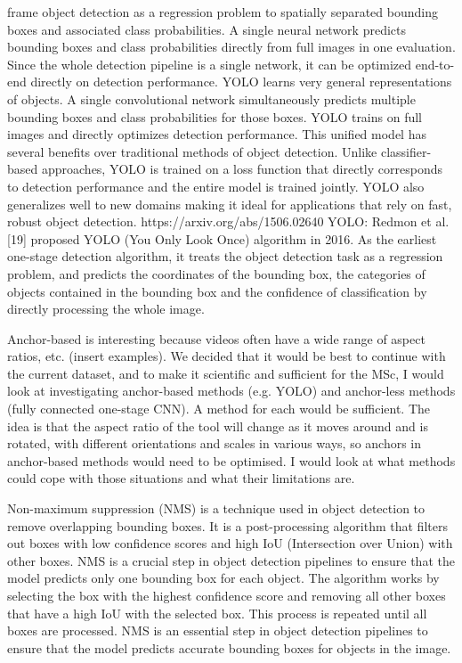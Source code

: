 frame object detection as a regression problem to spatially separated bounding boxes and associated class probabilities. A single neural network predicts bounding boxes and class probabilities directly from full images in one evaluation. Since the whole detection pipeline is a single network, it can be optimized end-to-end directly on detection performance. YOLO learns very general representations of objects. A single convolutional network simultaneously predicts multiple bounding boxes and class probabilities for those boxes. YOLO trains on full images and directly optimizes detection performance. This unified model has several benefits over traditional methods of object detection. Unlike classifier-based approaches, YOLO is trained on a loss function that directly corresponds to detection performance and the entire model is trained jointly. YOLO also generalizes well to new domains making it ideal for applications that rely on fast, robust object detection. https://arxiv.org/abs/1506.02640
YOLO: Redmon et al.[19] proposed YOLO (You Only Look Once) algorithm in 2016. As the earliest one-stage detection algorithm, it treats the object detection task as a regression problem, and predicts the coordinates of the bounding box, the categories of objects contained in the bounding box and the confidence of classification by directly processing the whole image. 

Anchor-based is interesting because videos often have a wide range of aspect ratios, etc. (insert examples). We decided that it would be best to continue with the current dataset, and to make it scientific and sufficient for the MSc, I would look at investigating anchor-based methods (e.g. YOLO) and anchor-less methods (fully connected one-stage CNN). A method for each would be sufficient. The idea is that the aspect ratio of the tool will change as it moves around and is rotated, with different orientations and scales in various ways, so anchors in anchor-based methods would need to be optimised. I would look at what methods could cope with those situations and what their limitations are.

Non-maximum suppression (NMS) is a technique used in object detection to remove overlapping bounding boxes. It is a post-processing algorithm that filters out boxes with low confidence scores and high IoU (Intersection over Union) with other boxes. NMS is a crucial step in object detection pipelines to ensure that the model predicts only one bounding box for each object. The algorithm works by selecting the box with the highest confidence score and removing all other boxes that have a high IoU with the selected box. This process is repeated until all boxes are processed. NMS is an essential step in object detection pipelines to ensure that the model predicts accurate bounding boxes for objects in the image. 

